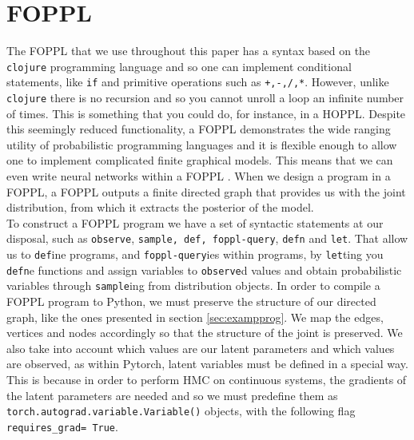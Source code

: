 \section{FOPPL}
\label{sec:foppl}
The FOPPL\citep{woodgroup2017} that we use throughout this paper has a syntax based on the \texttt{clojure} \citep{Hickey2008} programming language and so one can implement conditional statements, like \texttt{if} and primitive operations such as \texttt{+,-,/,*}. However, unlike \texttt{clojure} there is no recursion and so you cannot unroll a loop an infinite number of times. This is something that you could do, for instance, in a HOPPL. Despite this seemingly reduced functionality, a FOPPL demonstrates the wide ranging utility of probabilistic programming languages and it is flexible enough to allow one to implement complicated finite graphical models. This means that we can even write neural networks within a FOPPL \citep{woodgroup2017}. When we design a program in a FOPPL, a FOPPL outputs a finite directed graph that provides us with the joint distribution, from which it extracts the posterior of the model.\\
To construct a FOPPL program we have a set of syntactic statements at our disposal, such as \texttt{observe}, \texttt{sample, def, foppl-query}, \texttt{defn} and \texttt{let}. That allow us to \texttt{def}ine programs, and \texttt{foppl-query}ies within programs,  by \texttt{let}ting you \texttt{defn}e functions and assign variables to \texttt{observe}d values and obtain probabilistic variables through \texttt{sample}ing from distribution objects. In order to compile a FOPPL program to Python, we must preserve the structure of our directed graph, like the ones presented in section \ref{sec:exampprog}.  We map the edges, vertices and nodes accordingly so that the structure of the joint is preserved. We also take into account which values are our latent parameters and which values are observed, as within Pytorch, latent variables must be defined in a special way. This is because in order to perform HMC on continuous systems, the gradients of the latent parameters are needed and so we must predefine them as  \texttt{torch.autograd.variable.Variable()} objects, with the following flag \texttt{requires_grad= True}.\\
